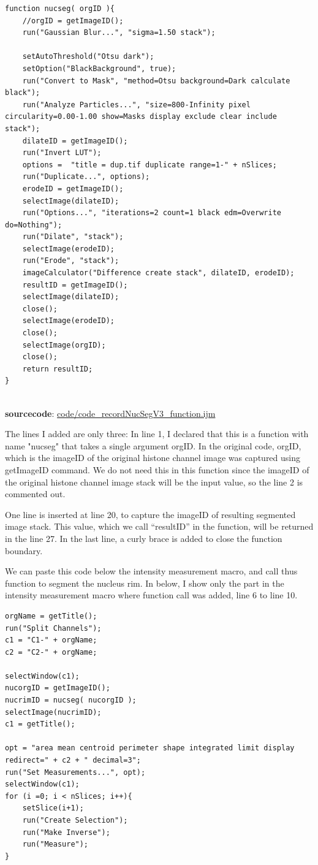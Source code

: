 \documentclass[11pt,a4paper,oneside]{report}
\begin{document}
\begin{lstlisting}[morekeywords={*, function, return, orgID, resultID, nucseg}]
function nucseg( orgID ){
	//orgID = getImageID();
	run("Gaussian Blur...", "sigma=1.50 stack");
	
	setAutoThreshold("Otsu dark");
	setOption("BlackBackground", true);
	run("Convert to Mask", "method=Otsu background=Dark calculate black");
	run("Analyze Particles...", "size=800-Infinity pixel circularity=0.00-1.00 show=Masks display exclude clear include stack");
	dilateID = getImageID();
	run("Invert LUT");
	options =  "title = dup.tif duplicate range=1-" + nSlices;
	run("Duplicate...", options);
	erodeID = getImageID();
	selectImage(dilateID);
	run("Options...", "iterations=2 count=1 black edm=Overwrite do=Nothing");
	run("Dilate", "stack");
	selectImage(erodeID);
	run("Erode", "stack");
	imageCalculator("Difference create stack", dilateID, erodeID);
	resultID = getImageID();
	selectImage(dilateID);
	close();
	selectImage(erodeID);
	close();
	selectImage(orgID);
	close();
	return resultID;
}


\end{lstlisting}
\textbf{sourcecode}: \href{http://www.example.com/contents}{code/code\_recordNucSegV3\_function.ijm}

The lines I added are only three: In line 1, I declared that this is a function with name "nucseg" that takes a single argument orgID. In the original code, orgID, which is the imageID of the original histone channel image was captured using getImageID command. We do not need this in this function since the imageID of the original histone channel image stack will be the input value, so the line 2 is commented out. 

One line is inserted at line 20, to capture the imageID of resulting segmented image stack. This value, which we call ``resultID'' in the function, will be returned in the line 27. In the last line, a curly brace is added to close the function boundary. 

We can paste this code below the intensity measurement macro, and call thus function to segment the nucleus rim. In below, I show only the part in the intensity measurement macro where function call was added, line 6 to line 10. 

\begin{lstlisting}
orgName = getTitle();
run("Split Channels");
c1 = "C1-" + orgName;
c2 = "C2-" + orgName;

selectWindow(c1);
nucorgID = getImageID();
nucrimID = nucseg( nucorgID );
selectImage(nucrimID);
c1 = getTitle();

opt = "area mean centroid perimeter shape integrated limit display redirect=" + c2 + " decimal=3";
run("Set Measurements...", opt);
selectWindow(c1);
for (i =0; i < nSlices; i++){
	setSlice(i+1);
	run("Create Selection");
	run("Make Inverse");
	run("Measure");
}
\end{lstlisting}
\end{document}
